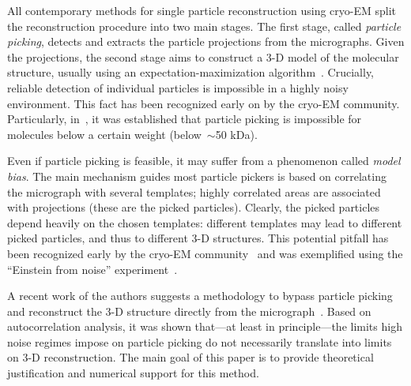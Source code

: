 \documentclass[12pt]{article}
\newcommand{\1}{\mathbf{1}}
\theoremstyle{plain}
\theoremstyle{definition}
\theoremstyle{remark}
\theoremstyle{plain}
\theoremstyle{remark}
\theoremstyle{plain}
\theoremstyle{plain}
\theoremstyle{plain}
\numberwithin{equation}{section}
\begin{document}
All contemporary methods for single particle reconstruction using cryo-EM  split the reconstruction procedure into two main  stages.
The first stage, called \emph{particle picking},  detects and extracts the particle projections from the micrographs. Given the projections, the second stage aims to construct a 3-D model of the molecular structure, usually using an expectation-maximization algorithm~\cite{scheres2012relion}. 
Crucially, reliable detection of individual particles is impossible in a highly noisy environment. This fact has been recognized early on by the cryo-EM community. 
Particularly, in~\cite{henderson1995limitations,glaeser1999electron}, it was established that particle picking is impossible for molecules below a certain weight (below~$\sim$50 kDa). 

Even if particle picking is feasible, it may suffer from a phenomenon called \emph{model bias}.
The main mechanism guides  most particle pickers is based on correlating the micrograph with several templates; highly correlated areas are associated with projections (these are the picked particles). 
Clearly, the picked particles depend heavily on the chosen templates: different templates may lead to different picked particles, and thus to different 3-D structures.
This potential pitfall 
has been recognized early by the cryo-EM community~\cite{vanheel1992correlation,henderson2013avoiding,vanheel2013finding} and was  exemplified using the
``Einstein from noise'' experiment~\cite{shatsky2009method}. %

A recent work of the authors suggests a methodology to bypass particle picking and  reconstruct the 3-D structure directly from the micrograph~\cite{bendory2018toward}.
Based on autocorrelation analysis, it was shown that---at least in principle---the limits high noise regimes 
impose on particle picking  do not necessarily translate into limits on 3-D reconstruction.
The main goal of  this paper is to provide theoretical justification and numerical support  for this method.
\end{document}
